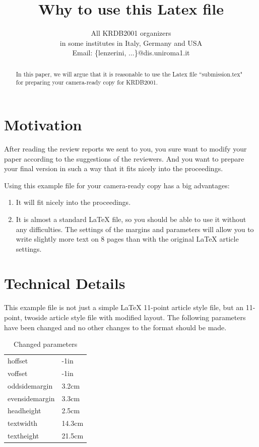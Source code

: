 \documentclass[11pt,twoside]{article}
\title{Why to use this Latex file}
\author{All KRDB2001 organizers\\
  in some institutes in Italy, Germany and USA\\
  Email: \{lenzerini, ...\}@dis.uniroma1.it}
\date{}
\begin{document}
\maketitle{}

\begin{abstract}
  In this paper, we will argue that it is reasonable to use the Latex
  file ``submission.tex" for preparing your camera-ready copy for
  KRDB2001. 
\end{abstract}

\section{Motivation}

After reading the review reports we sent to you, you sure want to
modify your paper according to the suggestions of the reviewers. And
you want to prepare your final version in such a way that it fits
nicely into the proceedings.


Using this example file for your camera-ready copy has a big advantages:

\begin{enumerate}
\item It will fit nicely into the proceedings.
\item It is almost a standard LaTeX file, so you should be able to use
  it without any difficulties. The settings of the margins and
  parameters will allow you to write slightly more text on 8 pages
  than with the original LaTeX article settings.
\end{enumerate}




\section{Technical Details}
This example file is not just a simple LaTeX 11-point article style
file, but an 11-point, twoside article style file with modified layout.
The following parameters have been changed and no other changes to the
format should be made.

\begin{table}[htbp]
  \begin{center}
    \begin{tabular}{ll}
      hoffset& -1in\\
      voffset& -1in\\
      oddsidemargin& 3.2cm\\
      evensidemargin& 3.3cm\\
      headheight& 2.5cm\\
      textwidth& 14.3cm\\
      textheight&21.5cm
    \end{tabular}
    \caption{Changed parameters}
  \end{center}
\end{table}
\end{document}
